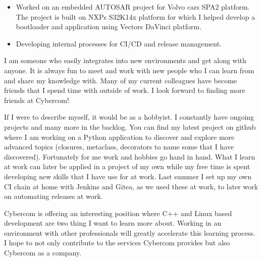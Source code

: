 \documentclass[10pt,a4paper,ragged2e,withhyper]{altacv}
\begin{document}
\begin{paracol}{2}

\begin{itemize}
\item Worked on an embedded AUTOSAR project for Volvo cars SPA2 platform. The project is 
built on NXPs S32K14x platform for which I helped develop a bootloader and application using Vectors 
DaVinci platform.
\item Developing internal processes for CI/CD and release management. 
\end{itemize}


I am someone who easily integrates into new environments and get along with anyone. 
It is always fun to meet and work with new people who I can learn from and share my knowledge with.
Many of my current colleagues have become friends that I spend time with outside of work. I look
forward to finding more friends at Cybercom!
\smallskip

If I were to describe myself, it would be as a hobbyist. I constantly have ongoing projects and many more in
the backlog. You can find my latest project on github where I am working on a Python application to 
discover and explore more advanced topics (closures, metaclass, decorators to name some that I have discovered).
Fortunately for me work and hobbies go hand in hand. What I learn at work can later be applied in a project 
of my own while my free time is spent developing new skills that I have use for at work. Last summer 
I set up my own CI chain at home with Jenkins and Gitea, as we used these at work, to later work on 
automating releases at work.
\smallskip

Cybercom is offering an interesting position where C++ and Linux based development are two thing I want to
learn more about. Working in an environment with other professionals will greatly accelerate this learning 
process. I hope to not only contribute to the services Cybercom provides but also Cybercom as a company.

\medskip


\switchcolumn


\end{paracol}
\end{document}
